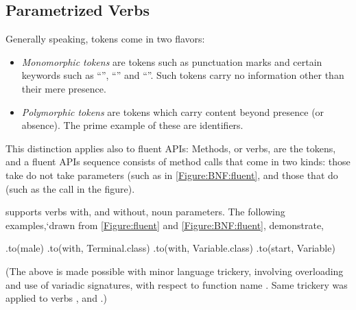 \subsection{Parametrized Verbs}
Generally speaking, tokens come in two flavors:
\begin{itemize}
  \item \emph{Monomorphic tokens} are tokens such as punctuation marks and
    certain keywords such as ``'', ``'' and ``''.
    Such tokens carry no information other than their mere presence.
  \item \emph{Polymorphic tokens} are tokens which carry content beyond
    presence (or absence).  The prime example of these are identifiers.
\end{itemize}

This distinction applies also to fluent APIs:
Methods, or verbs, are the tokens, and a fluent APIs sequence consists of 
method calls that come in two kinds: those take do not take parameters (such as  in \cref{Figure:BNF:fluent}, 
and those that do (such as the call  in the figure).

\SELF supports verbs with, and without, noun parameters. 
The following examples,`drawn from \cref{Figure:fluent} and \cref{Figure:BNF:fluent},
  demonstrate, 
\begin{JAVA}
    .to(male)
    .to(with, Terminal.class)
    .to(with, Variable.class)
    .to(start, Variable)\end{JAVA}
(The above is made possible with minor \Java language trickery,
  involving overloading and use of variadic signatures,
  with respect to function name .
Same trickery was applied to verbs , and .)



  
